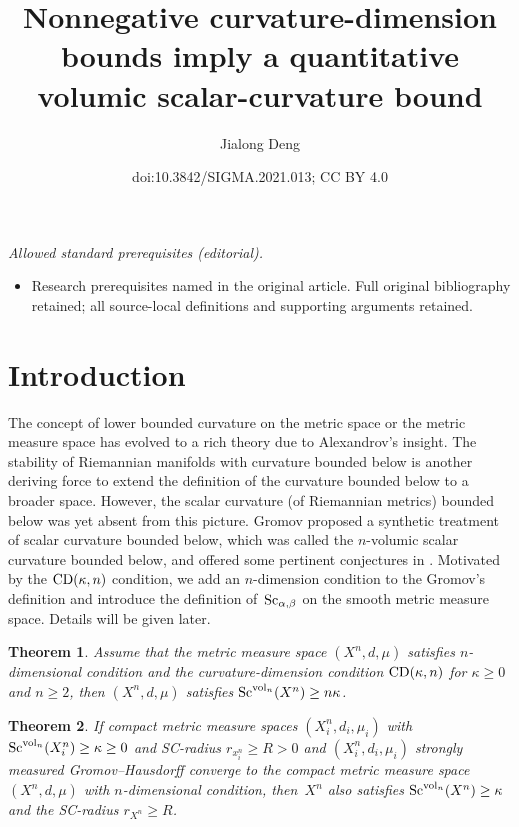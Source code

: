 \documentclass[10pt,a4paper]{amsart}
\title{Nonnegative curvature-dimension bounds imply a quantitative volumic scalar-curvature bound}
\author{Jialong Deng}
\date{doi:10.3842/SIGMA.2021.013; CC BY 4.0}
\newtheorem{Theorem}{Theorem}[section]
\begin{document}
\maketitle
\noindent\textit{Allowed standard prerequisites (editorial).}\begin{itemize}
\item Research prerequisites named in the original article. Full original bibliography retained; all source-local definitions and supporting arguments retained.
\end{itemize}\medskip
\section{Introduction}

The concept of lower bounded curvature on the metric space or the metric measure space has evolved to a rich theory due to Alexandrov's insight. The stability of Riemannian manifolds with curvature bounded below is another deriving force to extend the definition of the curvature bounded below to a broader space. However, the scalar curvature (of Riemannian metrics) bounded below was yet absent from this picture. Gromov proposed a synthetic treatment of scalar curvature bounded below, which was called the $n$-volumic scalar curvature bounded below, and offered some pertinent conjectures in \cite[Section~26]{Gromov}. Motivated by the ${\rm CD}(\kappa,n)$ condition, we add an $n$-dimension condition to the Gromov's definition and introduce the definition of~${\rm Sc}_{\alpha, \beta}$ on the smooth metric measure space. Details will be given later.

\begin{Theorem}Assume that the metric measure space $(X^n, d, \mu)$ satisfies $n$-dimensional condition and the curvature-dimension condition ${\rm CD}(\kappa, n)$ for $\kappa\geq 0$ and $n\geq 2$, then $(X^n, d, \mu)$ satisfies ${\rm Sc}^{{\rm vol}_n}(X^n)\geq n\kappa$.
\end{Theorem}

\begin{Theorem}
If compact metric measure spaces $(X_i^n, d_i, \mu_i)$ with ${\rm Sc}^{{\rm vol}_n}(X^n_i)\geq \kappa\geq 0$ and SC-radius $r_{x^n_i}\geq R>0$ and $(X_i^n, d_i, \mu_i)$ strongly measured Gromov--Hausdorff converge to the compact metric measure space $(X^n, d, \mu)$ with $n$-dimensional condition, then~$X^n$ also satisfies ${\rm Sc}^{{\rm vol}_n}(X^n)\geq \kappa$ and the SC-radius $r_{X^n}\geq R$.
\end{Theorem}
\end{document}

